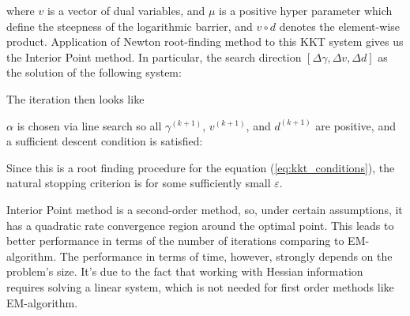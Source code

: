 \documentclass[11pt,letterpaper]{article}
\numberwithin{equation}{section} %
\numberwithin{figure}{section} %
\numberwithin{table}{section} %
\begin{document}
where $v$ is a vector of dual variables, and $\mu$ is a positive hyper parameter which define the steepness of the logarithmic barrier, and $v\circ d$ denotes the element-wise product.
Application of Newton root-finding method to this KKT system gives us the Interior Point method. In particular, the search direction $[\Delta\gamma, \Delta v, \Delta d]$ as the solution of the following system:


The iteration then looks like

$\alpha$ is chosen via line search so all $\gamma^{(k+1)}$, $v^{(k+1)}$, and $d^{(k+1)}$ are positive, and a sufficient descent condition is satisfied:


Since this is a root finding procedure for the equation (\ref{eq:kkt_conditions}), the natural stopping criterion is 
for some sufficiently small $\varepsilon$. 

Interior Point method is a second-order method, so, under certain assumptions, it has a quadratic rate convergence region around the optimal point. This leads to better performance in terms of the number of iterations comparing to EM-algorithm. The performance in terms of time, however, strongly depends on the problem's size. It's due to the fact that working with Hessian information requires solving a linear system, which is not needed for first order methods like EM-algorithm.  
\end{document}
